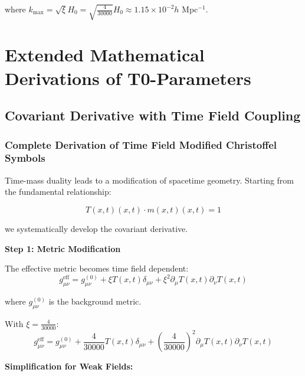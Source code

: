 \documentclass[12pt,a4paper]{report}
\newcommand{\Tfield}{T(x,t)}  %
\newcommand{\mfield}{m(x,t)}  %
\newcommand{\xipar}{\xi}      %
\begin{document}
	where $k_{\text{max}} = \sqrt{\xipar} H_0 = \sqrt{\frac{4}{30000}} H_0 \approx 1.15 \times 10^{-2} h$ Mpc$^{-1}$.
	
	\chapter{Extended Mathematical Derivations of T0-Parameters}\label{chap:extended_derivations}
	
	\section{Covariant Derivative with Time Field Coupling}\label{sec:covariant_derivative_derivation}
	
	\subsection{Complete Derivation of Time Field Modified Christoffel Symbols}\label{subsec:christoffel_derivation}
	
	Time-mass duality leads to a modification of spacetime geometry. Starting from the fundamental relationship:
	
	\begin{equation}\label{eq:fundamental_duality}
		\Tfield(x,t) \cdot \mfield(x,t) = 1
	\end{equation}
	
	we systematically develop the covariant derivative.
	
	\textbf{Step 1: Metric Modification}
	
	The effective metric becomes time field dependent:
	\begin{equation}\label{eq:effective_metric_complete}
		g_{\mu\nu}^{\text{eff}} = g_{\mu\nu}^{(0)} + \xipar \Tfield \delta_{\mu\nu} + \xipar^2 \partial_\mu \Tfield \partial_\nu \Tfield
	\end{equation}
	
	where $g_{\mu\nu}^{(0)}$ is the background metric.
	
	With $\xipar = \frac{4}{30000}$:
	\begin{equation}
		g_{\mu\nu}^{\text{eff}} = g_{\mu\nu}^{(0)} + \frac{4}{30000} \Tfield \delta_{\mu\nu} + \left(\frac{4}{30000}\right)^2 \partial_\mu \Tfield \partial_\nu \Tfield
	\end{equation}
	
	\textbf{Simplification for Weak Fields:}
	
\end{document}
